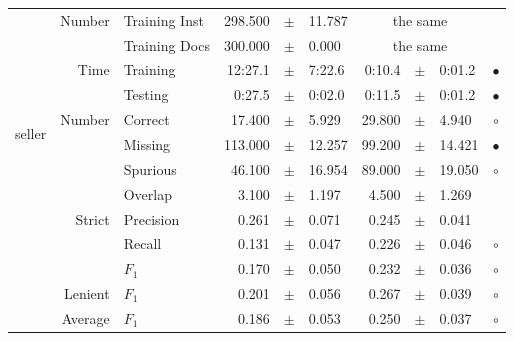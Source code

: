 \begin{longtable}{|r|r|l||rcl|rcl|c|}
\cline{2-10} & \multirow{2}{*}{    Number} &   Training Inst &     298.500 &  $\pm$  &      11.787 &    \multicolumn{3}{c|}{the same}         &  \\
\cline{3-10} &                             &   Training Docs &     300.000 &  $\pm$  &       0.000 &    \multicolumn{3}{c|}{the same}         &  \\
\cline{2-10} & \multirow{2}{*}{      Time} &        Training &     12:27.1 &  $\pm$  &      7:22.6 &      0:10.4 &  $\pm$  &      0:01.2 & $\bullet$ \\
\cline{3-10} &                             &         Testing &      0:27.5 &  $\pm$  &      0:02.0 &      0:11.5 &  $\pm$  &      0:01.2 & $\bullet$ \\
\hline
\hline
\multirow{11}{*}{\begin{sideways}seller\end{sideways} }
             & \multirow{4}{*}{    Number} &         Correct &      17.400 &  $\pm$  &       5.929 &      29.800 &  $\pm$  &       4.940 & $\circ$ \\
\cline{3-10} &                             &         Missing &     113.000 &  $\pm$  &      12.257 &      99.200 &  $\pm$  &      14.421 & $\bullet$ \\
\cline{3-10} &                             &        Spurious &      46.100 &  $\pm$  &      16.954 &      89.000 &  $\pm$  &      19.050 & $\circ$ \\
\cline{3-10} &                             &         Overlap &       3.100 &  $\pm$  &       1.197 &       4.500 &  $\pm$  &       1.269 &  \\
\cline{2-10} & \multirow{3}{*}{    Strict} &       Precision &       0.261 &  $\pm$  &       0.071 &       0.245 &  $\pm$  &       0.041 &  \\
\cline{3-10} &                             &          Recall &       0.131 &  $\pm$  &       0.047 &       0.226 &  $\pm$  &       0.046 & $\circ$ \\
\cline{3-10} &                             &           $F_1$ &       0.170 &  $\pm$  &       0.050 &       0.232 &  $\pm$  &       0.036 & $\circ$ \\
\cline{2-10} &                     Lenient &           $F_1$ &       0.201 &  $\pm$  &       0.056 &       0.267 &  $\pm$  &       0.039 & $\circ$ \\
\cline{2-10} &                     Average &           $F_1$ &       0.186 &  $\pm$  &       0.053 &       0.250 &  $\pm$  &       0.037 & $\circ$ \\

\end{longtable}
